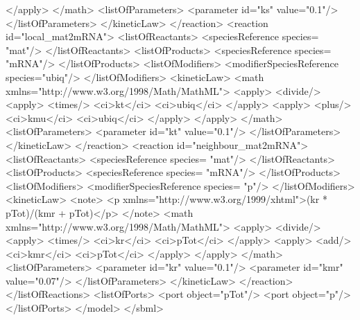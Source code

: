 \documentclass{cekarticle}
\begin{document}
\begin{example}
                    </apply>
                </math>
                <listOfParameters>
                    <parameter id="ks" value="0.1"/>
                </listOfParameters>
            </kineticLaw>
        </reaction>
        <reaction id="local_mat2mRNA">
            <listOfReactants>
                <speciesReference species= "mat"/>
            </listOfReactants>
            <listOfProducts>
                <speciesReference species= "mRNA"/>
            </listOfProducts>
             <listOfModifiers>
                <modifierSpeciesReference species="ubiq"/>
            </listOfModifiers>
           <kineticLaw>
                <math xmlns="http://www.w3.org/1998/Math/MathML">
                    <apply>
                        <divide/>
                        <apply>
                            <times/>
                            <ci>kt</ci>
                            <ci>ubiq</ci>    
                        </apply>
                        <apply>
                            <plus/>
                            <ci>kmu</ci>
                            <ci>ubiq</ci>
                        </apply>
                    </apply>
                </math>
                <listOfParameters>
                    <parameter id="kt" value="0.1"/>
                </listOfParameters>
            </kineticLaw>
        </reaction>
        <reaction id="neighbour_mat2mRNA">
            <listOfReactants>
                <speciesReference species= "mat"/>
            </listOfReactants>
            <listOfProducts>
                <speciesReference species= "mRNA"/>
            </listOfProducts>
            <listOfModifiers>
                <modifierSpeciesReference species= "p"/>
            </listOfModifiers>
            <kineticLaw>
                <note>
                    <p xmlns="http://www.w3.org/1999/xhtml">(kr * pTot)/(kmr + pTot)</p>
                </note>
                <math xmlns="http://www.w3.org/1998/Math/MathML">
                    <apply>
                        <divide/>
                        <apply>
                            <times/>
                            <ci>kr</ci>
                            <ci>pTot</ci>
                        </apply>    
                        <apply>
                            <add/>
                            <ci>kmr</ci>
                            <ci>pTot</ci>
                        </apply>    
                    </apply>
                </math>   
                <listOfParameters>
                    <parameter id="kr" value="0.1"/>
                    <parameter id="kmr" value="0.07"/>
                </listOfParameters>
            </kineticLaw>
        </reaction>
    </listOfReactions>
    <listOfPorts>
        <port object="pTot"/>
        <port object="p"/>
    </listOfPorts>
</model>
</sbml>
\end{example}
\end{document}
